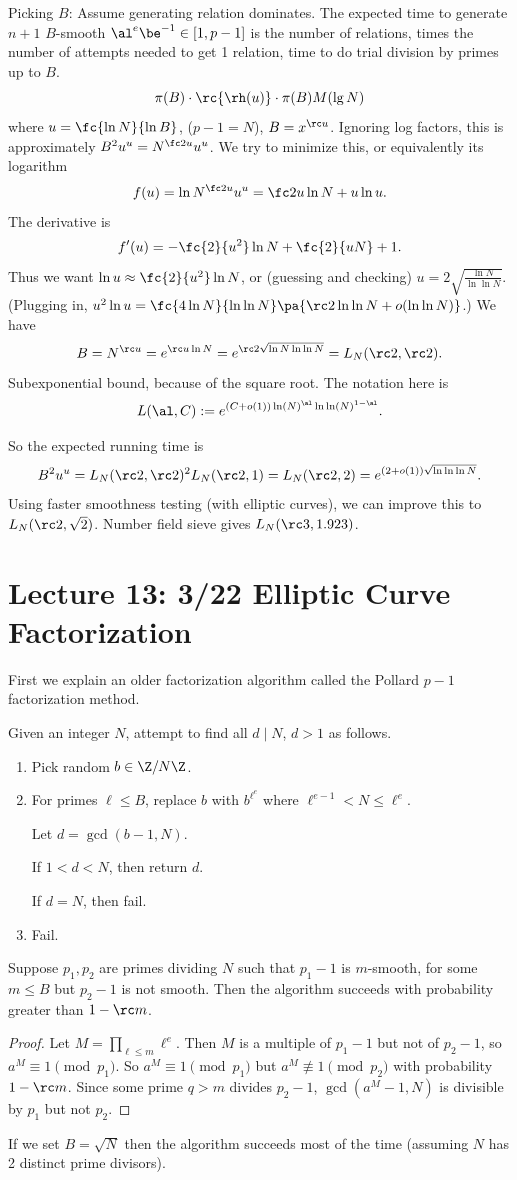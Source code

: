 Picking $B$: Assume generating relation dominates.
The expected time to generate $n+1$ $B$-smooth $\al^e\be^{-1}\in [1,p-1]$ is the number of relations, times the number of attempts needed to get 1 relation, time to do trial division by primes up to $B$.
\[
\pi(B)\cdot \rc{\rh(u)}\cdot \pi(B)M(\lg N)
\]
where $u=\fc{\ln N}{\ln B}$, ($p-1=N$), $B=x^{\rc u}$. Ignoring log factors, this is approximately $B^2u^u=N^{\fc 2u} u^u$. We try to minimize this, or equivalently its logarithm
\[
f(u)=\ln N^{\fc 2u} u^u = \fc 2u \ln N+u\ln u.
\]
The derivative is
\[
f'(u)=-\fc{2}{u^2} \ln N +\fc{2}{uN}+1.
\]
Thus we want $\ln u\approx \fc{2}{u^2}\ln N$, or (guessing and checking) $u=2\sqrt{\frac{\ln N}{\ln\ln N}}$. (Plugging in, $u^2\ln u=\fc{4 \ln N}{\ln\ln N}\pa{\rc 2\ln\ln N+o(\ln\ln N)}$.)
We have
\[
B=N^{\rc u}=e^{\rc u \ln N} = e^{\rc 2 \sqrt{\ln N\ln\ln N}}=L_N(\rc 2,\rc 2).
\]
Subexponential bound, because of the square root. The notation here is
\[
L(\al,C):=e^{(C+o(1)) \ln(N)^{\al}\ln\ln(N)^{1-\al}}.
\]

So the expected running time is 
\[
B^2u^u=L_N(\rc 2,\rc 2)^2 L_N(\rc 2,1)
=L_N(\rc 2,2) = e^{(2+o(1))\sqrt{\ln \ln\ln N}}.
\]
Using faster smoothness testing (with elliptic curves), we can improve this to $L_N(\rc 2,\sqrt 2)$. Number field sieve gives $L_N(\rc 3,1.923)$.
\section{Lecture 13: 3/22 Elliptic Curve Factorization}
First we explain an older factorization algorithm called the Pollard $p-1$ factorization method.

Given an integer $N$, attempt to find all $d\mid N$, $d>1$ as follows.
\begin{enumerate}
\item
Pick random $b\in \Z/N\Z$.
\item
For primes $\ell\le B$,  replace $b$ with $b^{\ell^e}$ where $\ell^{e-1}<N\le \ell^e$.

Let $d=\gcd(b-1,N)$.

If $1<d<N$, then return $d$.

If $d=N$, then fail.
\item Fail.
\end{enumerate}
\begin{clm}
Suppose $p_1,p_2$ are primes dividing $N$ such that $p_1-1$ is $m$-smooth, for some $m\le B$ but $p_{2}-1$ is not smooth. Then the algorithm succeeds with probability greater than $1-\rc m$.
\end{clm}
\begin{proof}
Let $M=\prod_{\ell\le m}\ell^e$. Then $M$ is a multiple of $p_1-1$ but not of $p_2-1$, so $a^M\equiv 1\pmod{p_1}$. So $a^M\equiv 1\pmod{p_1}$ but $a^M\nequiv 1\pmod{p_2}$ with probability $1-\rc m$. Since some prime $q>m$ divides $p_2-1$, $\gcd(a^M-1,N)$ is divisible by $p_1$ but not $p_2$. 
\end{proof}
If we set $B=\sqrt{N}$ then the algorithm succeeds most of the time (assuming $N$ has 2 distinct prime divisors).

